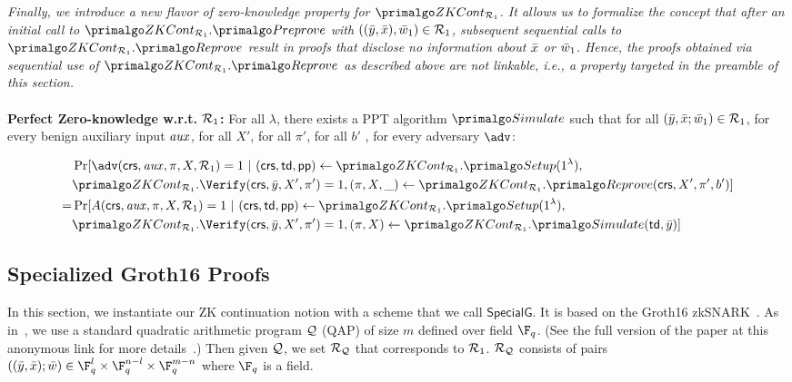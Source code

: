 \begin{definition}[ZK Continuation]
 \emph{Finally, we introduce a new flavor of zero-knowledge property for $ \ZKCont_{\relone} $. It allows us to formalize the concept that after an initial call to $\ZKCont_{\relone}.\Preprove$ with $((\bar{y}, \bar{x}), \bar{w}_1) \in \mathcal{R}_1$, subsequent sequential calls to $ \ZKCont_{\relone}.\Reprove $ result in proofs that disclose no information about $\bar{x}$ or $\bar{w}_1$.
Hence, the proofs obtained via sequential use of $ \ZKCont_{\relone}.\Reprove $ as described above are not linkable, i.e., a property targeted  in the preamble of this section. }
\\\\
\noindent \textbf{Perfect Zero-knowledge w.r.t. $\mathcal{R}_1$:} For all $\lambda$, there exists a PPT algorithm $ \Sim $ such that for all  $(\bar{y}, \bar{x}; \bar{w}_1) \in \mathcal{R}_1$, for every benign auxiliary input $\mathit{aux}$, for all $X'$, for all $\pi'$, for all $b'$ , for every adversary $\adv$:
\begin{footnotesize}
\begin{align*}
& \Pr [\adv(\crs, \realaux, \pi, X, \relone) = 1 \ | \ (\crs, \tw, \pp) \leftarrow \ZKCont_{\relone}.\Setup (1^{\lambda}), 
\\& \ZKCont_{\relone}.\Verify(\crs, \bary, X', \pi') = 1,  (\pi, X, \_) \leftarrow \ZKCont_{\relone}.\Reprove (\crs, X', \pi', b')] \\
= & \Pr[A(\crs, \realaux, \pi, X, \relone) = 1 \ | \ (\crs, \tw, \pp) \leftarrow \ZKCont_{\relone}.\Setup (1^{\lambda}), \\ 
                        & \ZKCont_{\relone}.\Verify(\crs, \bary, X', \pi') = 1,  (\pi, X) \leftarrow \ZKCont_{\relone}.\Sim(\tw, \bary)]
\end{align*}

\end{footnotesize}


\end{definition} 



\subsection{Specialized Groth16 Proofs}
\label{sec:rvrf_groth16}

In this section, we instantiate our ZK continuation notion with a scheme that we call  \emph{$\mathsf{SpecialG}$}. It is based on the Groth16 zkSNARK~\cite{Groth16}.
As in~\cite{Groth16}, we use a standard quadratic arithmetic program $ \mathcal{Q} $ (QAP) of size $ m $ defined over field $ \F_q $. 
(See the full version of the paper at this anonymous link for more details~\cite{anonymous}.)
Then given $ \mathcal{Q} $, we set  $ \mathcal{R}_{\mathcal{Q}}  $ that corresponds to $ \mathcal{R}_1 $. $ \mathcal{R}_{\mathcal{Q}} $  consists of pairs $((\bary, \barx); \baromega) \in \F_q^{l} \times \F_q^{n-l} \times \F_q^{m-n}$ where $\F_q$ is a field.  

